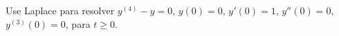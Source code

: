 Use Laplace para resolver $y^{(4)}-y=0$, $y(0)=0$, $y'(0)=1$, $y''(0)=0$, $y^{(3)}(0)=0$, para $t\ge0$.
